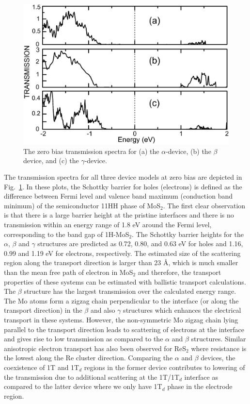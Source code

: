\begin{figure}[htb]
\centering
\includegraphics[width=0.8\linewidth]{TRANSMISSION-ALL-STRUCTURES.eps}%
\caption{\label{transport} The zero bias transmission spectra for (a) the $\alpha$-device, (b) the $\beta$ device, and (c) the $\gamma$-device. }
\end{figure}

The transmission spectra for all three  device models at zero bias are depicted in Fig.~\ref{transport}. In these plots, the Schottky barrier for holes (electrons) is defined as the difference between Fermi level and valence band maximum  (conduction band minimum) of the semiconductor 11HH phase of MoS$_2$. The first clear observation is that there is a large barrier height at the pristine interfaces and there is no transmission within an energy range of 1.8 eV around the Fermi level, corresponding to the band gap of 1H-MoS$_2$. The Schottky barrier heights for the $\alpha$, $\beta$ and $\gamma$ structures are predicted as 0.72,  0.80, and 0.63 eV for holes and 1.16, 0.99 and 1.19 eV for electrons, respectively. The estimated size of the scattering region along the transport direction is larger than 23 {\AA}, which is much smaller than the mean free path of electron in MoS$_2$\cite{mos2-trans} and therefore, the transport properties of these systems can be estimated with ballistic transport calculations. The $\beta$ structure has the largest transmission over the calculated energy range. The Mo atoms form a zigzag chain perpendicular to the interface (or along the transport direction) in the $\beta$ and also $\gamma$ structures which enhances the electrical transport in these systems. However, the non-symmetric Mo zigzag chain lying parallel  to the transport direction leads to scattering of electrons at the interface and gives rise to low transmission as compared to the $\alpha$ and $\beta$ structures. Similar anisotropic electron transport has also been  observed for ReS$_2$ where resistance is the lowest along the Re cluster direction\cite{doi:10.1021/acsnano.5b04851}. Comparing  the $\alpha$ and $\beta$ devices,  the coexistence of 1T and 1T$_d$ regions in the former device contributes to lowering of the transmission due to additional scattering at the 1T/1T$_d$ interface as compared to the latter device where we only have 1T$_d$ phase in the electrode region.

